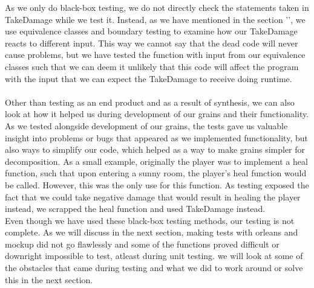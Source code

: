 As we only do black-box testing, we do not directly check the statements taken  in TakeDamage while we test it. Instead, as we have mentioned in the section '', we use equivalence classes and boundary testing to examine how our TakeDamage reacts to different input. This way we cannot say that the dead code will never cause problems, but we have tested the function with input from our equivalence classes such that we can deem it unlikely that this code will affect the program with the input that we can expect the TakeDamage to receive doing runtime. \\ \\
Other than testing as an end product and as a result of synthesis, we can also look at how it helped us during development of our grains and their functionality. As we tested alongside development of our grains, the tests gave us valuable insight into problems or bugs that appeared as we implemented functionality, but also ways to simplify our code, which helped as a way to make grains simpler for decomposition. As a small example, originally the player was to implement a heal function, such that upon entering a sunny room, the player's heal function would be called. However, this was the only use for this function. As testing exposed the fact that we could take negative damage that would result in healing the player instead, we scrapped the heal function and used TakeDamage instead. \\
Even though we have used these black-box testing methods, our testing is not complete. As we will discuss in the next section, making tests with orleans and mockup did not go flawlessly and some of the functions proved difficult or downright impossible to test, atleast during unit testing. we will look at some of the obstacles that came during testing and what we did to work around or solve this in the next section. 